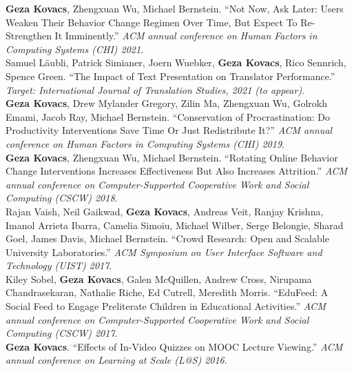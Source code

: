 
\textbf{Geza Kovacs}, Zhengxuan Wu, Michael Bernstein. ``Not Now, Ask Later: Users Weaken Their Behavior Change Regimen Over Time, But Expect To Re-Strengthen It Imminently.'' \emph{ACM annual conference on Human Factors in Computing Systems (CHI) 2021}.\\ %

Samuel Läubli, Patrick Simianer, Joern Wuebker, \textbf{Geza Kovacs}, Rico Sennrich, Spence Green. ``The Impact of Text Presentation on Translator Performance.'' \emph{Target: International Journal of Translation Studies, 2021 (to appear)}.\\

\textbf{Geza Kovacs}, Drew Mylander Gregory, Zilin Ma, Zhengxuan Wu, Golrokh Emami, Jacob Ray, Michael Bernstein. ``Conservation of Procrastination: Do Productivity Interventions Save Time Or Just Redistribute It?'' \emph{ACM annual conference on Human Factors in Computing Systems (CHI) 2019}.\\ %


\textbf{Geza Kovacs}, Zhengxuan Wu, Michael Bernstein. ``Rotating Online Behavior Change Interventions Increases Effectiveness But Also Increases Attrition.'' \emph{ACM annual conference on Computer-Supported Cooperative Work and Social Computing (CSCW) 2018}.\\ %

Rajan Vaish, Neil Gaikwad, \textbf{Geza Kovacs}, Andreas Veit, Ranjay Krishna, Imanol Arrieta Ibarra, Camelia Simoiu, Michael Wilber, Serge Belongie, Sharad Goel, James Davis, Michael Bernstein. ``Crowd Research: Open and Scalable University Laboratories.'' \emph{ACM Symposium on User Interface Software and Technology (UIST) 2017}.\\ %

Kiley Sobel, \textbf{Geza Kovacs}, Galen McQuillen, Andrew Cross, Nirupama Chandrasekaran, Nathalie Riche, Ed Cutrell, Meredith Morris. ``EduFeed: A Social Feed to Engage Preliterate Children in Educational Activities.'' \emph{ACM annual conference on Computer-Supported Cooperative Work and Social Computing (CSCW) 2017}.\\ %

\textbf{Geza Kovacs}. ``Effects of In-Video Quizzes on MOOC Lecture Viewing.'' \emph{ACM annual conference on Learning at Scale (L@S) 2016}.\\ %

